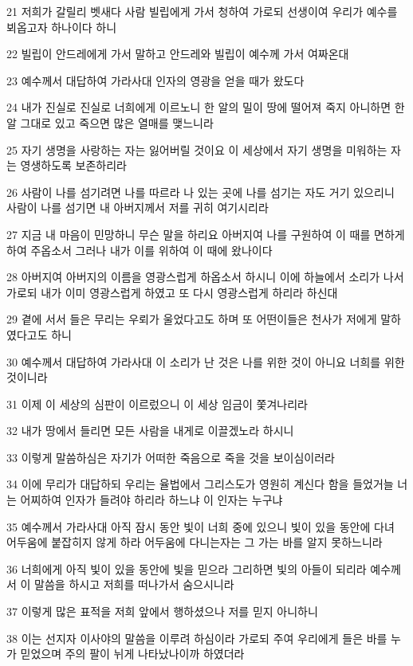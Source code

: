 \par 21 저희가 갈릴리 벳새다 사람 빌립에게 가서 청하여 가로되 선생이여 우리가 예수를 뵈옵고자 하나이다 하니
\par 22 빌립이 안드레에게 가서 말하고 안드레와 빌립이 예수께 가서 여짜온대
\par 23 예수께서 대답하여 가라사대 인자의 영광을 얻을 때가 왔도다
\par 24 내가 진실로 진실로 너희에게 이르노니 한 알의 밀이 땅에 떨어져 죽지 아니하면 한 알 그대로 있고 죽으면 많은 열매를 맺느니라
\par 25 자기 생명을 사랑하는 자는 잃어버릴 것이요 이 세상에서 자기 생명을 미워하는 자는 영생하도록 보존하리라
\par 26 사람이 나를 섬기려면 나를 따르라 나 있는 곳에 나를 섬기는 자도 거기 있으리니 사람이 나를 섬기면 내 아버지께서 저를 귀히 여기시리라
\par 27 지금 내 마음이 민망하니 무슨 말을 하리요 아버지여 나를 구원하여 이 때를 면하게 하여 주옵소서 그러나 내가 이를 위하여 이 때에 왔나이다
\par 28 아버지여 아버지의 이름을 영광스럽게 하옵소서 하시니 이에 하늘에서 소리가 나서 가로되 내가 이미 영광스럽게 하였고 또 다시 영광스럽게 하리라 하신대
\par 29 곁에 서서 들은 무리는 우뢰가 울었다고도 하며 또 어떤이들은 천사가 저에게 말하였다고도 하니
\par 30 예수께서 대답하여 가라사대 이 소리가 난 것은 나를 위한 것이 아니요 너희를 위한 것이니라
\par 31 이제 이 세상의 심판이 이르렀으니 이 세상 임금이 쫓겨나리라
\par 32 내가 땅에서 들리면 모든 사람을 내게로 이끌겠노라 하시니
\par 33 이렇게 말씀하심은 자기가 어떠한 죽음으로 죽을 것을 보이심이러라
\par 34 이에 무리가 대답하되 우리는 율법에서 그리스도가 영원히 계신다 함을 들었거늘 너는 어찌하여 인자가 들려야 하리라 하느냐 이 인자는 누구냐
\par 35 예수께서 가라사대 아직 잠시 동안 빛이 너희 중에 있으니 빛이 있을 동안에 다녀 어두움에 붙잡히지 않게 하라 어두움에 다니는자는 그 가는 바를 알지 못하느니라
\par 36 너희에게 아직 빛이 있을 동안에 빛을 믿으라 그리하면 빛의 아들이 되리라 예수께서 이 말씀을 하시고 저희를 떠나가서 숨으시니라
\par 37 이렇게 많은 표적을 저희 앞에서 행하셨으나 저를 믿지 아니하니
\par 38 이는 선지자 이사야의 말씀을 이루려 하심이라 가로되 주여 우리에게 들은 바를 누가 믿었으며 주의 팔이 뉘게 나타났나이까 하였더라
